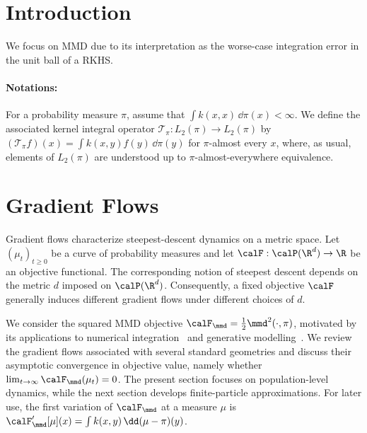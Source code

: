 
\section{Introduction}
We focus on MMD due to its interpretation as the worse-case integration error in the unit ball of a RKHS. 


\paragraph{Notations:}
For a probability measure $\pi$, assume that $\int k(x,x)\,\dd\pi(x)<\infty$. We define the associated kernel integral operator $\mathcal{T}_\pi:L_2(\pi)\to L_2(\pi)$ by $(\mathcal{T}_\pi f)(x)=\int k(x,y)f(y)\,\dd\pi(y)$ for $\pi$-almost every $x$, where, as usual, elements of $L_2(\pi)$ are understood up to $\pi$-almost-everywhere equivalence. 

\section{Gradient Flows}
Gradient flows characterize steepest-descent dynamics on a metric space. Let $(\mu_t)_{t\geq 0}$ be a curve of probability measures and let $\calF:\calP(\R^d)\to\R$ be an objective functional. The corresponding notion of steepest descent depends on the metric $d$ imposed on $\calP(\R^d)$. Consequently, a fixed objective $\calF$ generally induces different gradient flows under different choices of $d$.


We consider the squared MMD objective $\calF_{\mmd}=\frac{1}{2}\mmd^2(\cdot,\pi)$, motivated by its applications to numerical integration~\citep{chen2025stationary} and generative modelling~\citep{li2017mmd,arbel2018gradient,arbel2019maximum}. We review the gradient flows associated with several standard geometries and discuss their asymptotic convergence in objective value, namely whether $\lim_{t\to\infty}\calF_{\mmd}(\mu_t)=0$. The present section focuses on population-level dynamics, while the next section develops finite-particle approximations. 
For later use, the first variation of $\calF_{\mmd}$ at a measure $\mu$ is $\calF'_{\mmd}[\mu](x)=\int k(x,y)\,\dd(\mu-\pi)(y)$. 

